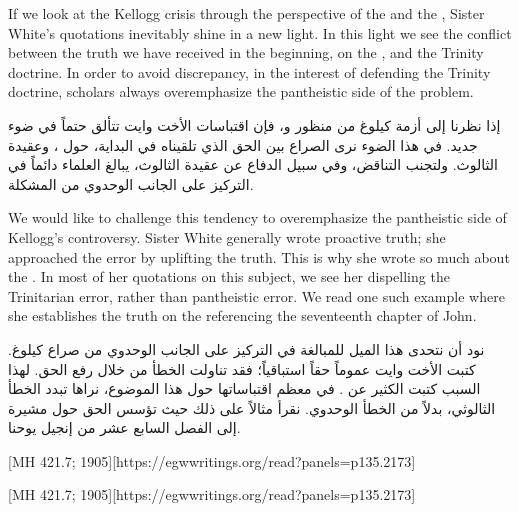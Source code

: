



If we look at the Kellogg crisis through the perspective of the  and the , Sister White’s quotations inevitably shine in a new light. In this light we see the conflict between the truth we have received in the beginning, on the , and the Trinity doctrine. In order to avoid discrepancy, in the interest of defending the Trinity doctrine, scholars always overemphasize the pantheistic side of the problem.


إذا نظرنا إلى أزمة كيلوغ من منظور  و، فإن اقتباسات الأخت وايت تتألق حتماً في ضوء جديد. في هذا الضوء نرى الصراع بين الحق الذي تلقيناه في البداية، حول ، وعقيدة الثالوث. ولتجنب التناقض، وفي سبيل الدفاع عن عقيدة الثالوث، يبالغ العلماء دائماً في التركيز على الجانب الوحدوي من المشكلة.


We would like to challenge this tendency to overemphasize the pantheistic side of Kellogg’s controversy. Sister White generally wrote proactive truth; she approached the error by uplifting the truth. This is why she wrote so much about the . In most of her quotations on this subject, we see her dispelling the Trinitarian error, rather than pantheistic error. We read one such example where she establishes the truth on the  referencing the seventeenth chapter of John.


نود أن نتحدى هذا الميل للمبالغة في التركيز على الجانب الوحدوي من صراع كيلوغ. كتبت الأخت وايت عموماً حقاً استباقياً؛ فقد تناولت الخطأ من خلال رفع الحق. لهذا السبب كتبت الكثير عن . في معظم اقتباساتها حول هذا الموضوع، نراها تبدد الخطأ الثالوثي، بدلاً من الخطأ الوحدوي. نقرأ مثالاً على ذلك حيث تؤسس الحق حول  مشيرة إلى الفصل السابع عشر من إنجيل يوحنا.


[MH 421.7; 1905][https://egwwritings.org/read?panels=p135.2173]


[MH 421.7; 1905][https://egwwritings.org/read?panels=p135.2173]


